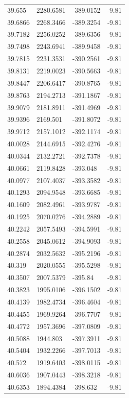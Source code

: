 \begin{table}[H]
\begin{tabular}{llll}
39.655 & 2280.6581 & -389.0152 & -9.81 \\
39.6866 & 2268.3466 & -389.3254 & -9.81 \\
39.7182 & 2256.0252 & -389.6356 & -9.81 \\
39.7498 & 2243.6941 & -389.9458 & -9.81 \\
39.7815 & 2231.3531 & -390.2561 & -9.81 \\
39.8131 & 2219.0023 & -390.5663 & -9.81 \\
39.8447 & 2206.6417 & -390.8765 & -9.81 \\
39.8763 & 2194.2713 & -391.1867 & -9.81 \\
39.9079 & 2181.8911 & -391.4969 & -9.81 \\
39.9396 & 2169.501 & -391.8072 & -9.81 \\
39.9712 & 2157.1012 & -392.1174 & -9.81 \\
40.0028 & 2144.6915 & -392.4276 & -9.81 \\
40.0344 & 2132.2721 & -392.7378 & -9.81 \\
40.0661 & 2119.8428 & -393.048 & -9.81 \\
40.0977 & 2107.4037 & -393.3582 & -9.81 \\
40.1293 & 2094.9548 & -393.6685 & -9.81 \\
40.1609 & 2082.4961 & -393.9787 & -9.81 \\
40.1925 & 2070.0276 & -394.2889 & -9.81 \\
40.2242 & 2057.5493 & -394.5991 & -9.81 \\
40.2558 & 2045.0612 & -394.9093 & -9.81 \\
40.2874 & 2032.5632 & -395.2196 & -9.81 \\
40.319 & 2020.0555 & -395.5298 & -9.81 \\
40.3507 & 2007.5379 & -395.84 & -9.81 \\
40.3823 & 1995.0106 & -396.1502 & -9.81 \\
40.4139 & 1982.4734 & -396.4604 & -9.81 \\
40.4455 & 1969.9264 & -396.7707 & -9.81 \\
40.4772 & 1957.3696 & -397.0809 & -9.81 \\
40.5088 & 1944.803 & -397.3911 & -9.81 \\
40.5404 & 1932.2266 & -397.7013 & -9.81 \\
40.572 & 1919.6403 & -398.0115 & -9.81 \\
40.6036 & 1907.0443 & -398.3218 & -9.81 \\
40.6353 & 1894.4384 & -398.632 & -9.81 \\

\end{tabular}
\end{table}
